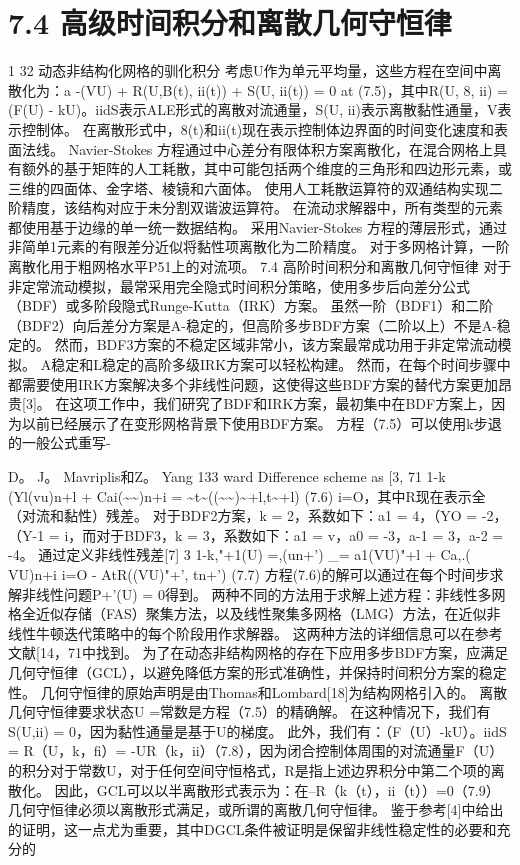 \documentclass[UTF8,11pt,a4paper,openany,fontset=fandol]{ctexbook}
\begin{document}
\section{7.4 高级时间积分和离散几何守恒律}
1 32 动态非结构化网格的驯化积分 考虑U作为单元平均量，这些方程在空间中离散化为：a -(VU) + R(U,B(t), ii(t)) + S(U, ii(t)) = 0 at (7.5)，其中R(U, 8, ii) = (F(U) - kU)。iidS表示ALE形式的离散对流通量，S(U, ii)表示离散黏性通量，V表示控制体。 在离散形式中，8(t)和ii(t)现在表示控制体边界面的时间变化速度和表面法线。 Navier-Stokes 方程通过中心差分有限体积方案离散化，在混合网格上具有额外的基于矩阵的人工耗散，其中可能包括两个维度的三角形和四边形元素，或三维的四面体、金字塔、棱镜和六面体。 使用人工耗散运算符的双通结构实现二阶精度，该结构对应于未分割双谐波运算符。 在流动求解器中，所有类型的元素都使用基于边缘的单一统一数据结构。 采用Navier-Stokes 方程的薄层形式，通过非简单1元素的有限差分近似将黏性项离散化为二阶精度。 对于多网格计算，一阶离散化用于粗网格水平P51上的对流项。 7.4 高阶时间积分和离散几何守恒律 对于非定常流动模拟，最常采用完全隐式时间积分策略，使用多步后向差分公式（BDF）或多阶段隐式Runge-Kutta（IRK）方案。 虽然一阶（BDF1）和二阶（BDF2）向后差分方案是A-稳定的，但高阶多步BDF方案（二阶以上）不是A-稳定的。 然而，BDF3方案的不稳定区域非常小，该方案最常成功用于非定常流动模拟。 A稳定和L稳定的高阶多级IRK方案可以轻松构建。 然而，在每个时间步骤中都需要使用IRK方案解决多个非线性问题，这使得这些BDF方案的替代方案更加昂贵[3]。 在这项工作中，我们研究了BDF和IRK方案，最初集中在BDF方案上，因为以前已经展示了在变形网格背景下使用BDF方案。 方程（7.5）可以使用k步退的一般公式重写-

D。 J。 Mavriplis和Z。 Yang 133 ward Difference scheme as [3, 71 1-k (Yl(vu)n+l + Cai(\textasciitilde{}\textasciitilde{})n+i = \textasciitilde{}t\textasciitilde{}((\textasciitilde{}\textasciitilde{})\textasciitilde{}+l,t\textasciitilde{}+l) (7.6) i=O，其中R现在表示全（对流和黏性）残差。 对于BDF2方案，k = 2，系数如下：a1 = 4，（YO = -2，（Y-1 = i，而对于BDF3，k = 3，系数如下：a1 = v，a0 = -3，a-1 = 3，a-2 = -4。 通过定义非线性残差[7] 3 1-k,"+1(U) =,(un+') \_= a1(VU)"+l + Ca,.( VU)n+i i=O - AtR((VU)"+', tn+') (7.7) 方程(7.6)的解可以通过在每个时间步求解非线性问题P+'(U) = 0得到。 两种不同的方法用于求解上述方程：非线性多网格全近似存储（FAS）聚集方法，以及线性聚集多网格（LMG）方法，在近似非线性牛顿迭代策略中的每个阶段用作求解器。 这两种方法的详细信息可以在参考文献[14，71中找到。 为了在动态非结构网格的存在下应用多步BDF方案，应满足几何守恒律（GCL），以避免降低方案的形式准确性，并保持时间积分方案的稳定性。 几何守恒律的原始声明是由Thomas和Lombard[18]为结构网格引入的。 离散几何守恒律要求状态U =常数是方程（7.5）的精确解。 在这种情况下，我们有S(U,ii) = 0，因为黏性通量是基于U的梯度。 此外，我们有：（F（U）-kU）。iidS = R（U，k，fi）= -UR（k，ii）（7.8），因为闭合控制体周围的对流通量F（U）的积分对于常数U，对于任何空间守恒格式，R是指上述边界积分中第二个项的离散化。 因此，GCL可以以半离散形式表示为：在--R（k（t），ii（t））=0（7.9）几何守恒律必须以离散形式满足，或所谓的离散几何守恒律。 鉴于参考[4]中给出的证明，这一点尤为重要，其中DGCL条件被证明是保留非线性稳定性的必要和充分的
\end{document}
